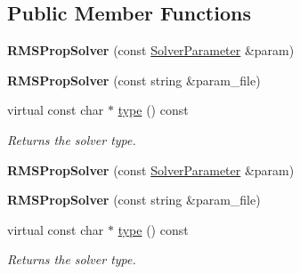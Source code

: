 \subsection*{Public Member Functions}
\begin{DoxyCompactItemize}
\item 
\mbox{\label{classcaffe_1_1_r_m_s_prop_solver_a6812979d38db698476698cfa344ff014}} 
{\bfseries R\+M\+S\+Prop\+Solver} (const \mbox{\hyperlink{classcaffe_1_1_solver_parameter}{Solver\+Parameter}} \&param)
\item 
\mbox{\label{classcaffe_1_1_r_m_s_prop_solver_a2f2f116bf48c2e3ddab4100467893075}} 
{\bfseries R\+M\+S\+Prop\+Solver} (const string \&param\+\_\+file)
\item 
\mbox{\label{classcaffe_1_1_r_m_s_prop_solver_a3be4ffd28e5aed1e2c02c5f9225986ba}} 
virtual const char $\ast$ \mbox{\hyperlink{classcaffe_1_1_r_m_s_prop_solver_a3be4ffd28e5aed1e2c02c5f9225986ba}{type}} () const
\begin{DoxyCompactList}\small\item\em Returns the solver type. \end{DoxyCompactList}\item 
\mbox{\label{classcaffe_1_1_r_m_s_prop_solver_a6812979d38db698476698cfa344ff014}} 
{\bfseries R\+M\+S\+Prop\+Solver} (const \mbox{\hyperlink{classcaffe_1_1_solver_parameter}{Solver\+Parameter}} \&param)
\item 
\mbox{\label{classcaffe_1_1_r_m_s_prop_solver_a2f2f116bf48c2e3ddab4100467893075}} 
{\bfseries R\+M\+S\+Prop\+Solver} (const string \&param\+\_\+file)
\item 
\mbox{\label{classcaffe_1_1_r_m_s_prop_solver_a3be4ffd28e5aed1e2c02c5f9225986ba}} 
virtual const char $\ast$ \mbox{\hyperlink{classcaffe_1_1_r_m_s_prop_solver_a3be4ffd28e5aed1e2c02c5f9225986ba}{type}} () const
\begin{DoxyCompactList}\small\item\em Returns the solver type. \end{DoxyCompactList}\end{DoxyCompactItemize}
